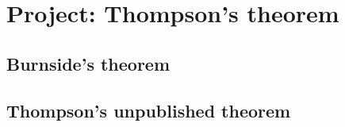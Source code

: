 \section{Project: Thompson's theorem}

\subsection{Burnside's theorem}

\subsection{Thompson's unpublished theorem}